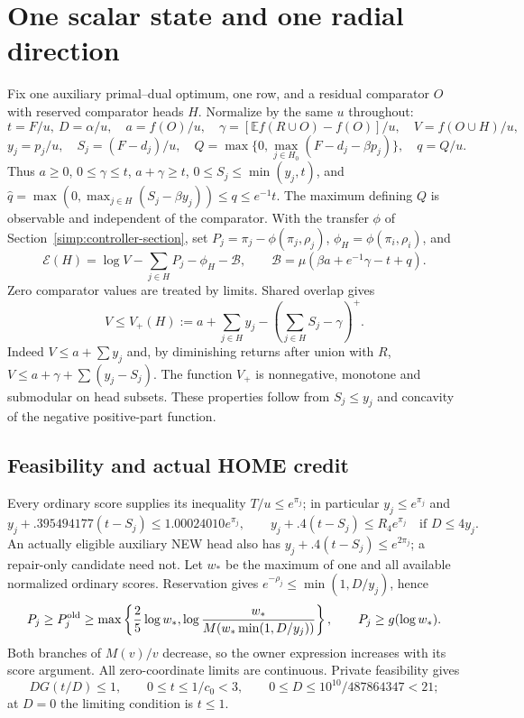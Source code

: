 \section{One scalar state and one radial direction}\label{simp:scalar-state}

Fix one auxiliary primal--dual optimum, one row, and a residual comparator
$O$ with reserved comparator heads $H$. Normalize by the same $u$ throughout:
\[
 t=F/u,\ D=\alpha/u,\quad a=f(O)/u,\quad
 \gamma=[\mathbb Ef(R\cup O)-f(O)]/u,\quad V=f(O\cup H)/u,
\]
\[
 y_j=p_j/u,\quad S_j=(F-d_j)/u,\quad
 Q=\max\{0,\max_{j\in H_0}(F-d_j-\beta p_j)\},\quad q=Q/u.
\]
Thus $a\ge0$, $0\le\gamma\le t$, $a+\gamma\ge t$,
$0\le S_j\le\min(y_j,t)$, and
$\widehat q=\max(0,\max_{j\in H}(S_j-\beta y_j))\le q\le e^{-1}t$.
The maximum defining $Q$ is observable and independent of the comparator.
With the transfer $\phi$ of Section~\ref{simp:controller-section}, set
$P_j=\pi_j-\phi(\pi_j,\rho_j)$, $\phi_H=\phi(\pi_i,\rho_i)$, and
\begin{equation}\label{eq:paper-exact-scalar}
 \mathcal E(H)=\log V-\sum_{j\in H}P_j-\phi_H
              -\mathcal B,\qquad
 \mathcal B=\mu(\beta a+e^{-1}\gamma-t+q).
\end{equation}
Zero comparator values are treated by limits. Shared overlap gives
\begin{equation}\label{eq:paper-shared-overlap}
 V\le V_+(H):=a+\sum_{j\in H}y_j-(\sum_{j\in H}S_j-\gamma)^+.
\end{equation}
Indeed $V\le a+\sum y_j$ and, by diminishing returns after union with $R$,
$V\le a+\gamma+\sum(y_j-S_j)$. The function $V_+$ is nonnegative,
monotone and submodular on head subsets. These properties follow from
$S_j\le y_j$ and concavity of the negative positive-part function.

\subsection{Feasibility and actual HOME credit}

Every ordinary score supplies its inequality $T/u\le e^{\pi_j}$;
in particular $y_j\le e^{\pi_j}$ and
\[
 y_j+.395494177(t-S_j)\le1.00024010e^{\pi_j},\qquad
 y_j+.4(t-S_j)\le R_4e^{\pi_j}\quad\text{if }D\le4y_j.
\]
An actually eligible auxiliary NEW head also has
$y_j+.4(t-S_j)\le e^{2\pi_j}$; a repair-only candidate need not.
Let $w_*$ be the maximum of one and all available normalized ordinary
scores. Reservation gives $e^{-\rho_j}\le\min(1,D/y_j)$, hence
\begin{equation}\label{simp:owner-price}
 P_j\ge P_j^{\rm old}\ge
 \max\left\{\frac25\log w_*,
 \log\frac{w_*}{M(w_*\min(1,D/y_j))}\right\},
 \qquad P_j\ge g(\log w_*).
\end{equation}
Both branches of $M(v)/v$ decrease, so the owner expression increases with
its score argument. All zero-coordinate limits are continuous.
Private feasibility gives
\begin{equation}\label{simp:private-domain}
 DG(t/D)\le1,\qquad 0\le t\le1/c_0<3,\qquad
 0\le D\le10^{10}/487864347<21;
\end{equation}
at $D=0$ the limiting condition is $t\le1$.

